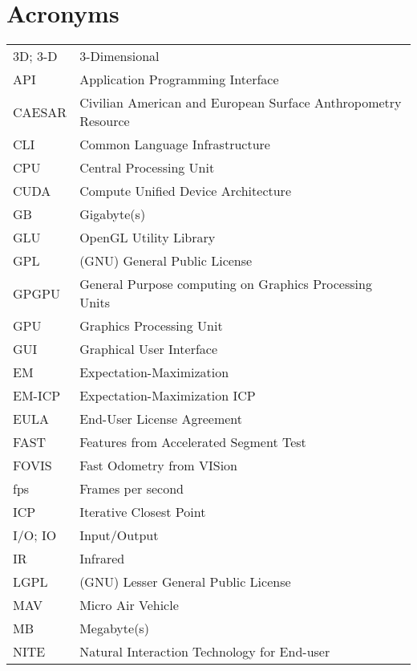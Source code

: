 \cleardoublepage
{}
{}
\chapter*{Acronyms}


\noindent
\begin{longtable}{@{}p{}p{}@{}}
    3D; 3-D & 3-Dimensional \\
        API & Application Programming Interface \\
     CAESAR & Civilian American and European Surface Anthropometry Resource \\
        CLI & Common Language Infrastructure \\
        CPU & Central Processing Unit \\
       CUDA & Compute Unified Device Architecture \\
         GB & Gigabyte(s) \\
        GLU & OpenGL Utility Library \\
        GPL & (GNU) General Public License \\
      GPGPU & General Purpose computing on Graphics Processing Units \\
        GPU & Graphics Processing Unit \\
        GUI & Graphical User Interface \\
         EM & Expectation-Maximization \\
     EM-ICP & Expectation-Maximization ICP \\
       EULA & End-User License Agreement \\
       FAST & Features from Accelerated Segment Test \\
      FOVIS & Fast Odometry from VISion \\
        fps & Frames per second \\
        ICP & Iterative Closest Point \\
    I/O; IO & Input/Output \\
         IR & Infrared \\
       LGPL & (GNU) Lesser General Public License \\
        MAV & Micro Air Vehicle \\
         MB & Megabyte(s) \\
       NITE & Natural Interaction Technology for End-user \\

\end{longtable}
